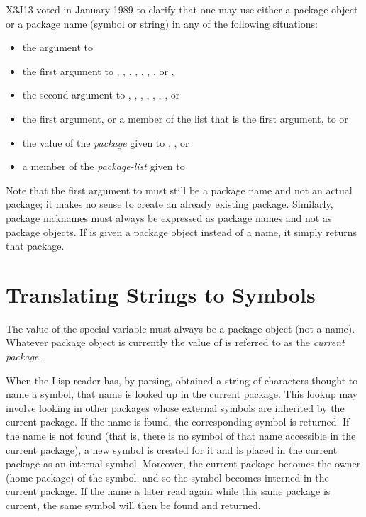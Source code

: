 \begin{new}
X3J13 voted in January 1989
to clarify that one may use either a package object or
a package name (symbol or string) in any of the following
situations:
\begin{itemize}
\item the  argument to 
\item the first argument to , ,
, ,
, ,
, or ,

\item the second argument to , ,
, , , , ,
or 
\item the first argument, or a member of the list that is the first argument,
to  or 
\item the value of the \emph{package} given to ,
, or 
\item a member of the \emph{package-list} given to 
\end{itemize}
Note that the first argument to  must still be a package
name and not an actual package; it makes no sense to create an already
existing package.  Similarly, package nicknames must always be expressed
as package names and not as package objects.  If  is
given a package object instead of a name, it simply returns that package.
\end{new}

\section{Translating Strings to Symbols}
\label{STRING-TO-SYMBOL-SECTION}

The value of the special variable  must always be a package
object (not a name).  Whatever package object is currently the
value of  is referred to as the \emph{current package}.

When the Lisp reader has, by parsing, obtained a string of characters
thought to name a symbol, that name is looked up in the current package.
This lookup may involve looking in other packages whose external symbols
are inherited by the current package.  If the name is found,
the corresponding symbol is returned.  If the name is not found
(that is, there is no symbol of that name accessible in the current package),
a new symbol is created for it and is placed in the current package as an
internal symbol.  Moreover, the current package becomes the owner
(home package) of the symbol, and so the symbol becomes interned
in the current package.
If the name is later read again while this same package is
current, the same symbol will then be found and returned.

